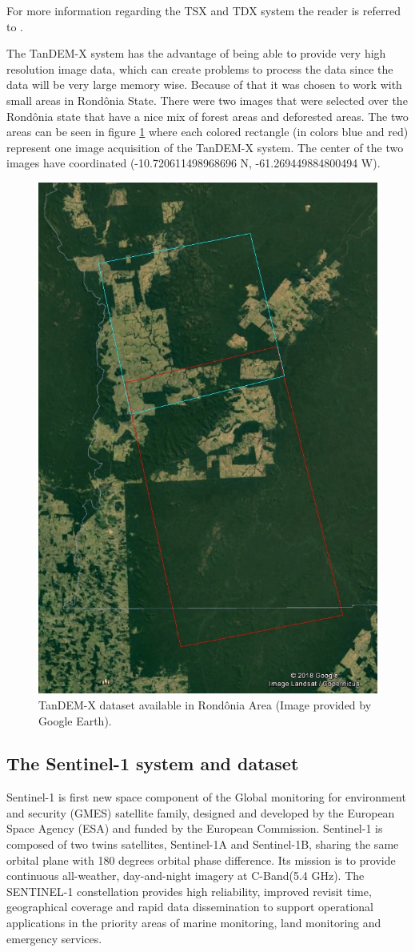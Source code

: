 For more information regarding the TSX and TDX system the reader is referred to \cite{Alberto}.

The TanDEM-X system has the advantage of being able to provide very high resolution image data, which can create problems to process the data since the data will be very large memory wise. Because of that it was chosen to work with small areas in Rondônia State. There were two images that were selected over the Rondônia state that have a nice mix of forest areas and deforested areas. The two areas can be seen in figure \ref{fig:tandem_dataset} where each colored rectangle (in colors blue and red) represent one image acquisition of the TanDEM-X system. The center of the two images have coordinated (-10.720611498968696 N, -61.269449884800494 W).

\begin{figure}[H]
    \centering
    \includegraphics[width=0.6\linewidth]{Cap2-Methods/tandem_dataset.jpg}
    \caption{TanDEM-X dataset available in Rondônia Area (Image provided by Google Earth).}
    \label{fig:tandem_dataset}
\end{figure}{}

\subsection{The Sentinel-1 system and dataset}

Sentinel-1 is first new space component of the Global monitoring for environment and security (GMES) satellite family, designed and developed by the European Space Agency (ESA) and funded by the European Commission. Sentinel-1 is composed of two twins satellites, Sentinel-1A and Sentinel-1B, sharing the same orbital plane with 180 degrees orbital phase difference. Its mission is to provide continuous all-weather, day-and-night imagery at C-Band(5.4 GHz). The SENTINEL-1 constellation provides high reliability, improved revisit time, geographical coverage and rapid data dissemination to support operational applications in the priority areas of marine monitoring, land monitoring and emergency services.

